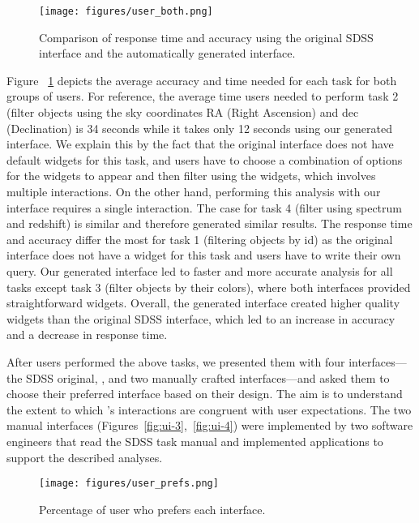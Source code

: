 \begin{figure}[h!]
    \centering
    \texttt{[image: figures/user\_both.png]}
    \caption{Comparison of response time and accuracy using the original SDSS interface and the automatically generated interface.}
    \label{fig:userstudy}
\end{figure}
Figure ~\ref{fig:userstudy} depicts the average accuracy and time needed for each task for both groups of users. For reference, the average time users needed to perform task 2 (filter objects using the sky coordinates RA (Right Ascension) and dec (Declination) is 34 seconds while it takes only 12 seconds using our generated interface. We explain this by the fact that the original interface does not have default widgets for this task, and users have to choose a combination of options for the widgets to appear and then filter using the widgets, which involves multiple interactions. On the other hand, performing this analysis with our interface requires a single interaction. The case for task 4 (filter using spectrum and redshift) is similar and therefore generated similar results. The response time and accuracy differ the most for task 1 (filtering objects by id) as the original interface does not have a widget for this task and users have to write their own query. Our generated interface led to faster and more accurate analysis for all tasks except task 3 (filter objects by their colors), where both interfaces provided straightforward widgets. Overall, the generated interface created higher quality widgets than the original SDSS interface, which led to an increase in accuracy and a decrease in response time.

After users performed the above tasks, we presented them with four interfaces---the SDSS original, \sys, and two manually crafted interfaces---and asked them to choose their preferred interface based on their design.  The aim is to understand the extent to which \sys's interactions are congruent with user expectations.  The two manual interfaces (Figures~\ref{fig:ui-3},~\ref{fig:ui-4}) were implemented by two software engineers that read the SDSS task manual and implemented applications to support the described analyses.

\begin{figure}[h!]
    \centering
    \texttt{[image: figures/user\_prefs.png]}
    \caption{Percentage of user who prefers each interface.}
    \label{fig:preference}
\end{figure}

